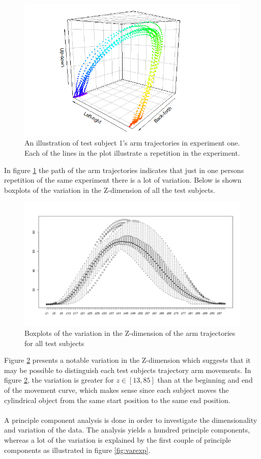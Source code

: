 \documentclass[11pt, fleqn, titlepage]{article}
\begin{document}
\begin{figure}[H]
	\centering
	\includegraphics[scale=0.6]{billeder/Rplot.png}
	\caption{An illustration of test subject 1's arm trajectories in experiment one. Each of the lines in the plot illustrate a repetition in the experiment. }
	\label{fig:rplot}
\end{figure}
\noindent
In figure \ref{fig:rplot} the path of the arm trajectories indicates that just in one persons repetition of the same experiment there is a lot of variation. Below is shown boxplots of the variation in the Z-dimension of all the test subjects.

\begin{figure}[H]
	\centering
	\includegraphics[width=0.55\linewidth]{billeder/boxplot_z.pdf}
	\caption{Boxplots of the variation in the Z-dimension of the arm trajectories for all test subjects}
	\label{fig:boxplotz}
\end{figure}
\noindent
Figure \ref{fig:boxplotz} presents a notable variation in the Z-dimension which suggests that it may be possible to distinguish each test subjects trajectory arm movements. In figure \ref{fig:boxplotz}, the variation is greater for $ z \in [13,85] $ than at the beginning and end of the movement curve, which makes sense since each subject moves the cylindrical object from the same start position to the same end position.
\\\\
A principle component analysis is done in order to investigate the dimensionality and variation of the data. The analysis yields a hundred principle components, whereas a lot of the variation is explained by the first couple of principle components as illustrated in figure \ref{fig:varexp}.
\end{document}
